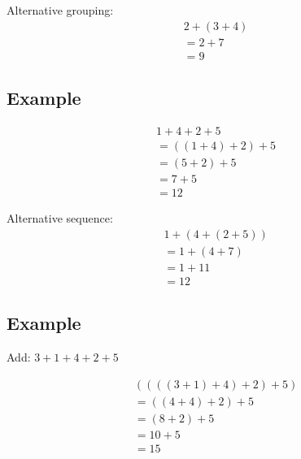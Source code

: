 \documentclass{article}
\begin{document}
Alternative grouping:
\begin{align*}
     & 2 + (3 + 4) \\
     & = 2 + 7     \\
     & = 9
\end{align*}

\subsection{Example}
\begin{align*}
     & 1 + 4 + 2 + 5       \\
     & = ((1 + 4) + 2) + 5 \\
     & = (5 + 2) + 5       \\
     & = 7 + 5             \\
     & = 12
\end{align*}

Alternative sequence:
\begin{align*}
     & 1 + (4 + (2 + 5)) \\
     & = 1 + (4 + 7)     \\
     & = 1 + 11          \\
     & = 12
\end{align*}

\subsection{Example}
Add: $3 + 1 + 4 + 2 + 5$

\begin{align*}
     & ((((3 + 1) + 4) + 2) + 5) \\
     & = ((4 + 4) + 2) + 5       \\
     & = (8 + 2) + 5             \\
     & = 10 + 5                  \\
     & = 15
\end{align*}
\end{document}
